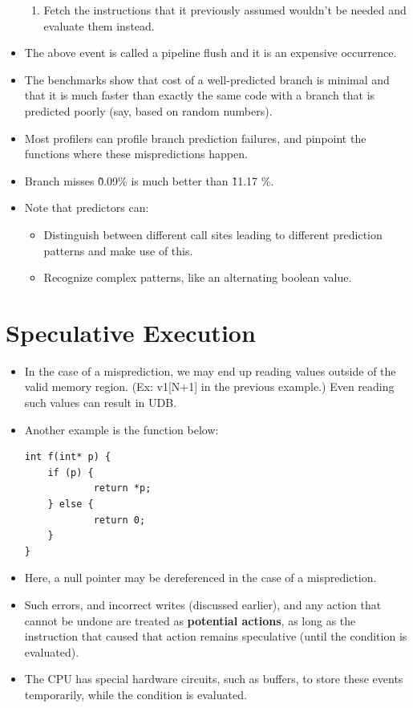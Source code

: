 \documentclass{report}
\begin{document}
\begin{itemize}
\begin{enumerate}
    \item Fetch the instructions that it previously assumed wouldn't be needed and evaluate them instead.
\end{enumerate} 
\item The above event is called a pipeline flush and it is an expensive occurrence.
\item The benchmarks show that cost of a well-predicted branch is minimal and that it is much faster than exactly the same code with a branch that is predicted poorly (say, based on random numbers).
\item Most profilers can profile branch prediction failures, and pinpoint the functions where these mispredictions happen.
\item Branch misses \~ 0.09\% is much better than \~ 11.17 \%.
\item Note that predictors can:
\begin{itemize}
    \item Distinguish between different call sites leading to different prediction patterns and make use of this.
    \item Recognize complex patterns, like an alternating boolean value. 
\end{itemize}
\end{itemize}
\section{Speculative Execution}
\begin{itemize}
\item In the case of a misprediction, we may end up reading values outside of the valid memory region. (Ex: v1[N+1] in the previous example.) Even reading such values can result in UDB.
\item Another example is the function below:
\begin{lstlisting}
int f(int* p) {
    if (p) {
            return *p;
    } else {
            return 0;
    }
}
\end{lstlisting}
\item Here, a null pointer may be dereferenced in the case of a misprediction.
\item Such errors, and incorrect writes (discussed earlier), and any action that cannot be undone are treated as \textbf{potential actions}, as long as the instruction that caused that action remains speculative (until the condition is evaluated).
\item The CPU has special hardware circuits, such as buffers, to store these events temporarily, while the condition is evaluated.
\end{itemize}
\end{document}
